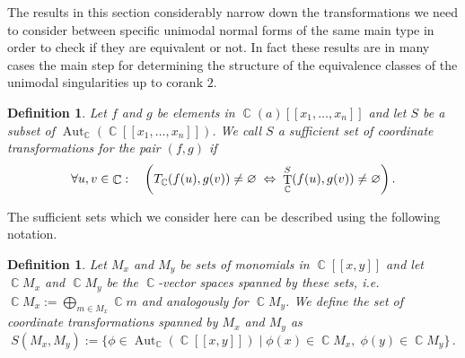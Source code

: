 \documentclass[noend]{amsproc}
\newtheorem{defn}[theorem]{Definition}
\theoremstyle{definition}
\let\originalleft\left
\let\originalright\right
\renewcommand{\left}{\mathopen{}\mathclose\bgroup\originalleft}
\renewcommand{\right}{\aftergroup\egroup\originalright}
\DeclareMathOperator{\C}{\mathbb{C}}
\DeclareMathOperator{\T}{T}
\DeclareMathOperator{\Aut}{Aut}
\begin{document}
The results in this section considerably narrow down the transformations we
need to consider between specific unimodal normal forms of the same main type
in order to check if they are equivalent or not. In fact these results are in
many cases the main step for determining the structure of the equivalence
classes of the unimodal singularities up to corank $2$.

\begin{defn}
Let $f$ and $g$ be elements in $\C(a)[[x_1,\ldots,x_n]]$ and let $S$ be a
subset of $\Aut_{\C}(\C[[x_1,\ldots,x_n]])$. We call $S$ a sufficient set of
coordinate transformations for the pair $(f, g)$ if
\[
\forall u,v \in \C: \quad
\left(T_{\C}(f(u),g(v)) \neq \varnothing
\;\Leftrightarrow\; \T_{\C}^S(f(u),g(v)) \neq \varnothing\right) \,.
\]
\end{defn}

The sufficient sets which we consider here can be described using the
following notation.

\begin{defn}
Let $M_x$ and $M_y$ be sets of monomials in $\C[[x,y]]$ and let $\C\! M_x$ and
$\C\! M_y$ be the $\C$-vector spaces spanned by these sets, i.e.\@
$\C\! M_x := \bigoplus_{m \in M_x} \C m$ and analogously for $\C\! M_y$. We
define the set of coordinate transformations spanned by $M_x$ and $M_y$ as
\[
S(M_x, M_y) := \{ \phi \in \Aut_{\C}(\C[[x,y]]) \mid
\phi(x) \in \C\! M_x,\; \phi(y) \in \C\! M_y \} \,.
\]
\end{defn}
\end{document}
